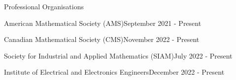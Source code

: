 \begin{rSection}{Professional Organisations}

\begin{rSubsectionSmall}{American Mathematical Society (AMS)}{September 2021 - Present}
\end{rSubsectionSmall}

\smallskip

\begin{rSubsectionSmall}{Canadian Mathematical Society (CMS)}{November 2022 - Present}
\end{rSubsectionSmall}

\smallskip

\begin{rSubsectionSmall}{Society for Industrial and Applied Mathematics (SIAM)}{July 2022 - Present}
\end{rSubsectionSmall}

\smallskip

\begin{rSubsectionSmall}{Institute of Electrical and Electronics Engineers}{December 2022 - Present}
\end{rSubsectionSmall}

\end{rSection}